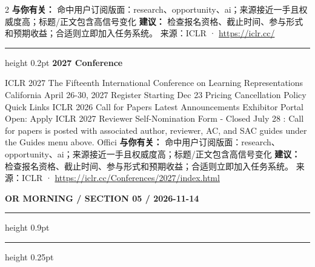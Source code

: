 \documentclass[10.5pt]{ctexart}
\begin{document}
\begin{multicols}{2}
\textbf{与你有关：} 命中用户订阅版面：research、opportunity、ai；来源接近一手且权威度高；标题/正文包含高信号变化
\textbf{建议：} 检查报名资格、截止时间、参与形式和预期收益；合适则立即加入任务系统。
{\footnotesize\color{ormuted} 来源：ICLR · \url{https://iclr.cc/}}
\vspace{2mm}
\hrule height 0.2pt
\vspace{2mm}
{\large\bfseries 2027 Conference}\par
ICLR 2027 The Fifteenth International Conference on Learning Representations California April 26-30, 2027 Register Starting Dec 23 Pricing Cancellation Policy Quick Links ICLR 2026 Call for Papers Latest Announcements Exhibitor Portal Open: Apply ICLR 2027 Reviewer Self-Nomination Form - Closed July 28 : Call for papers is posted with associated author, reviewer, AC, and SAC guides under the Guides menu above. Offici
\textbf{与你有关：} 命中用户订阅版面：research、opportunity、ai；来源接近一手且权威度高；标题/正文包含高信号变化
\textbf{建议：} 检查报名资格、截止时间、参与形式和预期收益；合适则立即加入任务系统。
{\footnotesize\color{ormuted} 来源：ICLR · \url{https://iclr.cc/Conferences/2027/index.html}}
\end{multicols}
\newpage
{\small\bfseries OR MORNING / SECTION 05 / 2026-11-14}
\vspace{2mm}
\hrule height 0.9pt
\vspace{1.5mm}
\hrule height 0.25pt
\vspace{4mm}
\end{document}
